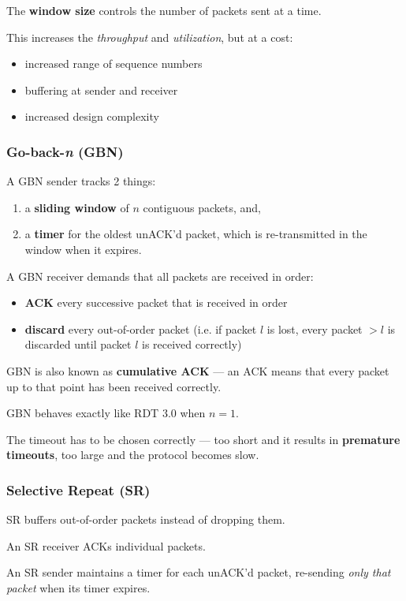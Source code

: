 The \textbf{window size} controls the number of packets sent at a time.

This increases the \textit{throughput} and \textit{utilization}, but at a cost:
\begin{itemize}
    \item increased range of sequence numbers
    \item buffering at sender and receiver
    \item increased design complexity
\end{itemize}

\subsubsection{Go-back-\emph{n} (GBN)}
A GBN sender tracks 2 things:
\begin{enumerate}
    \item a \textbf{sliding window} of $n$ contiguous packets, and,
    \item a \textbf{timer} for the oldest unACK'd packet, which is re-transmitted in the window when it expires.
\end{enumerate}

A GBN receiver demands that all packets are received in order:
\begin{itemize}
    \item \textbf{ACK} every successive packet that is received in order
    \item \textbf{discard} every out-of-order packet (i.e. if packet $l$ is lost, every packet $> l$ is discarded until packet $l$ is received correctly)
\end{itemize}

GBN is also known as \textbf{cumulative ACK} --- an ACK means that every
packet up to that point has been received correctly.

GBN behaves exactly like RDT 3.0 when $n = 1$.

The timeout has to be chosen correctly --- too short and it results in \textbf{premature timeouts},
too large and the protocol becomes slow.

\subsubsection{Selective Repeat (SR)}
SR buffers out-of-order packets instead of dropping them.

An SR receiver ACKs individual packets.

An SR sender maintains a timer for each unACK'd packet, re-sending \textit{only that packet} 
when its timer expires.


